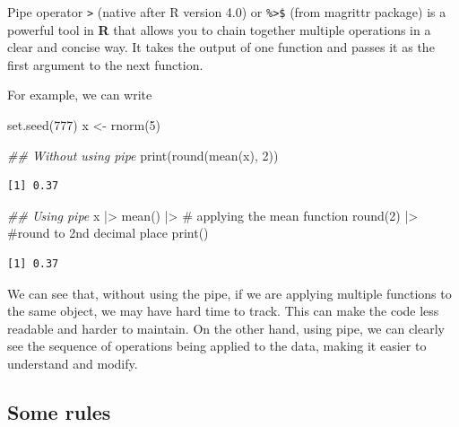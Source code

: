 \documentclass[
  letterpaper,
  DIV=11,
  numbers=noendperiod]{scrreprt}
\newenvironment{Shaded}{\begin{snugshade}}{\end{snugshade}}
\newcommand{\CommentTok}[1]{\textcolor[rgb]{0.37,0.37,0.37}{#1}}
\newcommand{\DecValTok}[1]{\textcolor[rgb]{0.68,0.00,0.00}{#1}}
\newcommand{\DocumentationTok}[1]{\textcolor[rgb]{0.37,0.37,0.37}{\textit{#1}}}
\newcommand{\FunctionTok}[1]{\textcolor[rgb]{0.28,0.35,0.67}{#1}}
\newcommand{\NormalTok}[1]{\textcolor[rgb]{0.00,0.23,0.31}{#1}}
\newcommand{\OtherTok}[1]{\textcolor[rgb]{0.00,0.23,0.31}{#1}}
\newcommand{\SpecialCharTok}[1]{\textcolor[rgb]{0.37,0.37,0.37}{#1}}
\begin{document}
Pipe operator \texttt{\textbar{}\textgreater{}} (native after R version
4.0) or \texttt{\%\textgreater{}\$} (from magrittr package) is a
powerful tool in \textbf{R} that allows you to chain together multiple
operations in a clear and concise way. It takes the output of one
function and passes it as the first argument to the next function.

For example, we can write

\begin{Shaded}
\begin{Highlighting}[]
\FunctionTok{set.seed}\NormalTok{(}\DecValTok{777}\NormalTok{)}
\NormalTok{x }\OtherTok{\textless{}{-}} \FunctionTok{rnorm}\NormalTok{(}\DecValTok{5}\NormalTok{)}

\DocumentationTok{\#\# Without using pipe}
\FunctionTok{print}\NormalTok{(}\FunctionTok{round}\NormalTok{(}\FunctionTok{mean}\NormalTok{(x), }\DecValTok{2}\NormalTok{))}
\end{Highlighting}
\end{Shaded}

\begin{verbatim}
[1] 0.37
\end{verbatim}

\begin{Shaded}
\begin{Highlighting}[]
\DocumentationTok{\#\# Using pipe}
\NormalTok{x }\SpecialCharTok{|\textgreater{}} 
  \FunctionTok{mean}\NormalTok{() }\SpecialCharTok{|\textgreater{}} \CommentTok{\# applying the mean function}
  \FunctionTok{round}\NormalTok{(}\DecValTok{2}\NormalTok{) }\SpecialCharTok{|\textgreater{}} \CommentTok{\#round to 2nd decimal place}
  \FunctionTok{print}\NormalTok{()}
\end{Highlighting}
\end{Shaded}

\begin{verbatim}
[1] 0.37
\end{verbatim}

We can see that, without using the pipe, if we are applying multiple
functions to the same object, we may have hard time to track. This can
make the code less readable and harder to maintain. On the other hand,
using pipe, we can clearly see the sequence of operations being applied
to the data, making it easier to understand and modify.

\subsection{Some rules}\label{some-rules}
\end{document}
